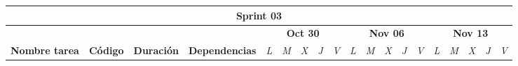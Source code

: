     \begin{table}[H]
        \centering
        \begin{tabular}{|llcllllllllllllllll|}
        \hline
        \multicolumn{19}{|c|}{\cellcolor[HTML]{8EA9D8}\textbf{Sprint 03}}                                                                                                                                                                                                                                                                                                                                                                                                                                                                                                                                                                                                                                                                                                                                                                                 \\ \hline
        \multicolumn{1}{|c|}{}                                                                                                  & \multicolumn{1}{c|}{}                                  & \multicolumn{1}{c|}{}                                    & \multicolumn{1}{c|}{}                                                        & \multicolumn{5}{c|}{\textbf{Oct 30}}                                                                                                                                    & \multicolumn{5}{c|}{\textbf{Nov 06}}                                                                                                                                    & \multicolumn{5}{c|}{\textbf{Nov 13}}                                                                                                                             \\ \cline{5-19} 
        \multicolumn{1}{|c|}{\multirow{-2}{*}{\textbf{Nombre tarea}}}                                                           & \multicolumn{1}{c|}{\multirow{-2}{*}{\textbf{Código}}} & \multicolumn{1}{c|}{\multirow{-2}{*}{\textbf{Duración}}} & \multicolumn{1}{c|}{\multirow{-2}{*}{\textbf{Dependencias}}}                 & \multicolumn{1}{l|}{\textit{L}} & \multicolumn{1}{l|}{\textit{M}} & \multicolumn{1}{l|}{\textit{X}} & \multicolumn{1}{l|}{\textit{J}} & \multicolumn{1}{l|}{\textit{V}} & \multicolumn{1}{l|}{\textit{L}} & \multicolumn{1}{l|}{\textit{M}} & \multicolumn{1}{l|}{\textit{X}} & \multicolumn{1}{l|}{\textit{J}} & \multicolumn{1}{l|}{\textit{V}} & \multicolumn{1}{l|}{\textit{L}} & \multicolumn{1}{l|}{\textit{M}} & \multicolumn{1}{l|}{\textit{X}} & \multicolumn{1}{l|}{\textit{J}} & \textit{V}               \\ \hline

\end{tabular}
\end{table}
